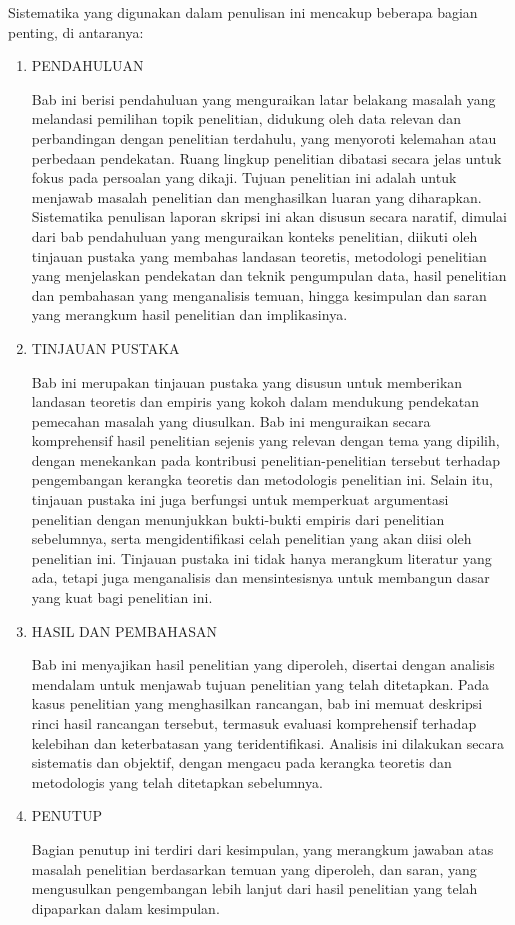 Sistematika yang digunakan dalam penulisan ini mencakup beberapa bagian
penting, di antaranya:
\begin{enumerate}
  \item PENDAHULUAN

        Bab ini berisi pendahuluan yang menguraikan latar belakang masalah
        yang melandasi pemilihan topik penelitian, didukung oleh data relevan
        dan perbandingan dengan penelitian terdahulu, yang menyoroti kelemahan
        atau perbedaan pendekatan. Ruang lingkup penelitian dibatasi secara
        jelas untuk fokus pada persoalan yang dikaji. Tujuan penelitian ini
        adalah untuk menjawab masalah penelitian dan menghasilkan luaran yang
        diharapkan. Sistematika penulisan laporan skripsi ini akan disusun
        secara naratif, dimulai dari bab pendahuluan yang menguraikan konteks
        penelitian, diikuti oleh tinjauan pustaka yang membahas landasan teoretis,
        metodologi penelitian yang menjelaskan pendekatan dan teknik pengumpulan
        data, hasil penelitian dan pembahasan yang menganalisis temuan, hingga
        kesimpulan dan saran yang merangkum hasil penelitian dan implikasinya.
  \item TINJAUAN PUSTAKA

        Bab ini merupakan tinjauan pustaka yang disusun untuk memberikan landasan
        teoretis dan empiris yang kokoh dalam mendukung pendekatan pemecahan
        masalah yang diusulkan. Bab ini menguraikan secara komprehensif hasil
        penelitian sejenis yang relevan dengan tema yang dipilih, dengan menekankan
        pada kontribusi penelitian-penelitian tersebut terhadap pengembangan
        kerangka teoretis dan metodologis penelitian ini. Selain itu, tinjauan
        pustaka ini juga berfungsi untuk memperkuat argumentasi penelitian
        dengan menunjukkan bukti-bukti empiris dari penelitian sebelumnya,
        serta mengidentifikasi celah penelitian yang akan diisi oleh penelitian
        ini. Tinjauan pustaka ini tidak hanya merangkum literatur yang ada,
        tetapi juga menganalisis dan mensintesisnya untuk membangun dasar
        yang kuat bagi penelitian ini.
  \item HASIL DAN PEMBAHASAN

        Bab ini menyajikan hasil penelitian yang diperoleh, disertai dengan
        analisis mendalam untuk menjawab tujuan penelitian yang telah ditetapkan.
        Pada kasus penelitian yang menghasilkan rancangan, bab ini memuat
        deskripsi rinci hasil rancangan tersebut, termasuk evaluasi komprehensif
        terhadap kelebihan dan keterbatasan yang teridentifikasi. Analisis
        ini dilakukan secara sistematis dan objektif, dengan mengacu pada
        kerangka teoretis dan metodologis yang telah ditetapkan sebelumnya.
  \item PENUTUP

        Bagian penutup ini terdiri dari kesimpulan, yang merangkum jawaban
        atas masalah penelitian berdasarkan temuan yang diperoleh, dan saran,
        yang mengusulkan pengembangan lebih lanjut dari hasil penelitian yang
        telah dipaparkan dalam kesimpulan.
\end{enumerate}